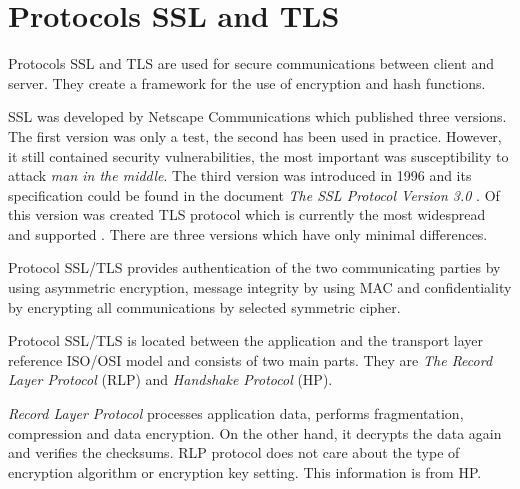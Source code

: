 \documentclass[
  digital, %
  notable,   %
  lof,     %
  lot,     %
]{fithesis3}
\begin{document}
\section{Protocols SSL and TLS}
Protocols SSL and TLS are used for secure communications between client and server. They 
create a framework for the use of encryption and hash functions.

SSL was developed by Netscape Communications which published three versions. The first version 
was only a test, the second has been used in practice. However, it still contained security 
vulnerabilities, the most important was susceptibility to attack \textit{man in the middle}. %
The third version was introduced in 1996 and its specification could be found in the document 
\textit{The SSL Protocol Version 3.0} \cite{freier2011secure}. Of this version was created TLS 
protocol which is currently the most widespread and supported \cite{oppliger2003security}. 
There are three versions which have only minimal differences.

Protocol SSL/TLS provides authentication of the two communicating parties by using asymmetric 
encryption, message integrity by using MAC and confidentiality by encrypting all 
communications by selected symmetric cipher.

Protocol SSL/TLS is located between the application and the transport layer reference ISO/OSI 
model and consists of two main parts. They are \textit{The Record Layer Protocol} (RLP) and 
\textit{Handshake Protocol} (HP). %

\textit{Record Layer Protocol} processes application data, performs fragmentation, compression 
and data encryption. On the other hand, it decrypts the data again and verifies the checksums. 
RLP protocol does not care about the type of encryption algorithm or encryption key setting. 
This information is from HP.
\end{document}
